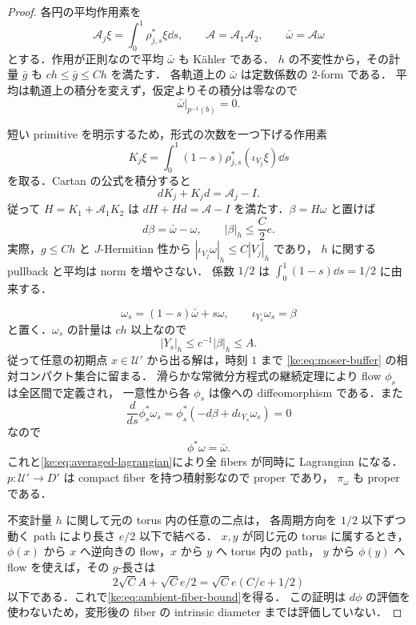 \begin{proof}
各円の平均作用素を
\[
 \mathcal A_j\xi=\int_0^1\rho_{j,s}^*\xi\dd s,
 \qquad \mathcal A=\mathcal A_1\mathcal A_2,
 \qquad \bar\omega=\mathcal A\omega
\]
とする．作用が正則なので平均 $\bar\omega$ も Kähler である．
$h$ の不変性から，その計量 $\bar g$ も $ch\le\bar g\le Ch$ を満たす．
各軌道上の $\bar\omega$ は定数係数の $2$-form である．
平均は軌道上の積分を変えず，仮定よりその積分は零なので
\begin{equation}\label{ke:eq:averaged-lagrangian}
 \bar\omega|_{p^{-1}(b)}=0.
\end{equation}

短い primitive を明示するため，形式の次数を一つ下げる作用素
\[
 K_j\xi=\int_0^1(1-s)\rho_{j,s}^*(\iota_{V_j}\xi)\dd s
\]
を取る．Cartan の公式を積分すると
\[
 dK_j+K_jd=\mathcal A_j-I.
\]
従って $H=K_1+\mathcal A_1K_2$ は
$dH+Hd=\mathcal A-I$ を満たす．$\beta=H\omega$ と置けば
\begin{equation}\label{ke:eq:averaging-primitive}
 d\beta=\bar\omega-\omega,
 \qquad |\beta|_h\le \frac C2e.
\end{equation}
実際，$g\le Ch$ と $J$-Hermitian 性から
$|\iota_{V_j}\omega|_h\le C|V_j|_h$ であり，
$h$ に関する pullback と平均は norm を増やさない．
係数 $1/2$ は $\int_0^1(1-s)\dd s=1/2$ に由来する．

\[
 \omega_s=(1-s)\bar\omega+s\omega,
 \qquad \iota_{Y_s}\omega_s=\beta
\]
と置く．$\omega_s$ の計量は $ch$ 以上なので
\[
 |Y_s|_h\le c^{-1}|\beta|_h\le A.
\]
従って任意の初期点 $x\in\mathcal U'$ から出る解は，時刻 $1$ まで
\eqref{ke:eq:moser-buffer} の相対コンパクト集合に留まる．
滑らかな常微分方程式の継続定理により flow $\phi_s$ は全区間で定義され，
一意性から各 $\phi_s$ は像への diffeomorphism である．また
\[
 \frac{d}{ds}\phi_s^*\omega_s
 =\phi_s^*(-d\beta+d\iota_{Y_s}\omega_s)=0
\]
なので
\begin{equation}\label{ke:eq:moser-pullback}
 \phi^*\omega=\bar\omega.
\end{equation}
これと\eqref{ke:eq:averaged-lagrangian}により全 fibers が同時に Lagrangian になる．
$p:\mathcal U'\to D'$ は compact fiber を持つ積射影なので proper であり，
$\pi_\omega$ も proper である．

不変計量 $h$ に関して元の torus 内の任意の二点は，
各周期方向を $1/2$ 以下ずつ動く path により長さ $e/2$ 以下で結べる．
$x,y$ が同じ元の torus に属するとき，
$\phi(x)$ から $x$ へ逆向きの flow，$x$ から $y$ へ torus 内の path，
$y$ から $\phi(y)$ へ flow を使えば，その $g$-長さは
\[
 2\sqrt C A+\sqrt C e/2
 =\sqrt C e(C/c+1/2)
\]
以下である．これで\eqref{ke:eq:ambient-fiber-bound}を得る．
この証明は $d\phi$ の評価を使わないため，変形後の fiber の
intrinsic diameter までは評価していない．
\end{proof}

